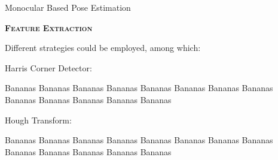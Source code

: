 \documentclass[10pt]{beamer}
\begin{document}
\begin{frame}{Monocular Based Pose Estimation}

  \bigskip

  \textsc{\textbf{\large Feature Extraction}}

  \bigskip

  Different strategies could be employed, among which:

  \begin{minipage}[t]{0.4\textwidth}
    \vspace{0.01mm}
    Harris Corner Detector:
  \end{minipage}%
  \begin{minipage}[t]{0.6\textwidth}
    \vspace{0.01mm}
    Bananas Bananas Bananas Bananas Bananas Bananas Bananas Bananas Bananas Bananas Bananas Bananas Bananas
  \end{minipage}

  \bigskip

  \begin{minipage}[t]{0.4\textwidth}
    \vspace{0.01mm}
    Hough Transform:
  \end{minipage}%
  \begin{minipage}[t]{0.6\textwidth}
    \vspace{0.01mm}
    Bananas Bananas Bananas Bananas Bananas Bananas Bananas Bananas Bananas Bananas Bananas Bananas Bananas
  \end{minipage}

  \bigskip

\end{frame}
\end{document}
